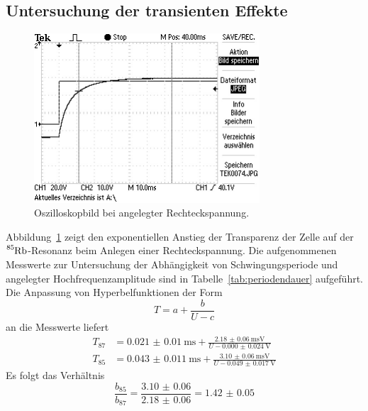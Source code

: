 \subsection{Untersuchung der transienten Effekte}
%
\begin{figure}[htb]
  \centering
  \includegraphics[width=0.75\textwidth]{analysis/anstieg.png}
  \caption{Oszilloskopbild bei angelegter Rechteckspannung.}
  \label{fig:anstieg}
\end{figure}
%
Abbildung~\ref{fig:anstieg} zeigt den exponentiellen Anstieg der Transparenz
der Zelle auf der~$\ce{^85Rb}$-Resonanz beim Anlegen einer Rechteckspannung.
Die aufgenommenen Messwerte zur Untersuchung der Abhängigkeit von
Schwingungsperiode und angelegter Hochfrequenzamplitude sind in
Tabelle~\ref{tab:periodendauer} aufgeführt. Die Anpassung von
Hyperbelfunktionen der Form
%
\begin{equation}
  T=a+\frac{b}{U-c}
\end{equation}
%
an die Messwerte liefert
%
\begin{align}
  T_{87}&=\SI{0.021(10)}{\milli\second}+\frac{\SI{2.18(6)}{\milli\second\volt}}{U-\SI{0.000(24)}{\volt}} \\
  T_{85}&=\SI{0.043(11)}{\milli\second}+\frac{\SI{3.10(6)}{\milli\second\volt}}{U-\SI{0.049(17)}{\volt}}
\end{align}
%
Es folgt das Verhältnis
%
\begin{equation}
  \frac{b_{85}}{b_{87}}=\frac{\num{3.10(6)}}{\num{2.18(6)}}=\num{1.42(5)}
\end{equation}
%
